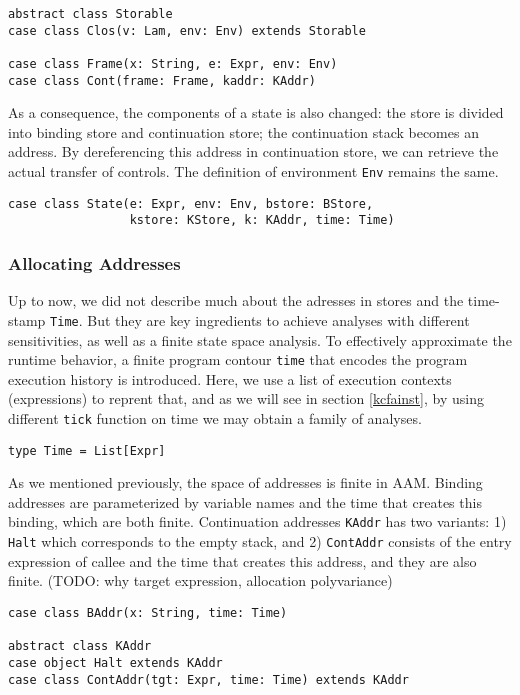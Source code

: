 \documentclass[acmsmall,review,anonymous]{acmart}\settopmatter{printfolios=true,printccs=false,printacmref=false}
\begin{document}
\begin{verbatim}
abstract class Storable 
case class Clos(v: Lam, env: Env) extends Storable

case class Frame(x: String, e: Expr, env: Env)
case class Cont(frame: Frame, kaddr: KAddr)
\end{verbatim}

As a consequence, the components of a state is also changed: 
the store is divided into binding store and continuation store;
the continuation stack becomes an address.
By dereferencing this address in continuation store, we can retrieve the 
actual transfer of controls. The definition of environment \texttt{Env}
remains the same.

\begin{verbatim}
case class State(e: Expr, env: Env, bstore: BStore, 
                 kstore: KStore, k: KAddr, time: Time)
\end{verbatim}

\subsubsection{Allocating Addresses}
Up to now, we did not describe much about the adresses in stores and the 
time-stamp \texttt{Time}.
But they are key ingredients to achieve analyses with different sensitivities,
as well as a finite state space analysis.
To effectively approximate the runtime behavior, a finite 
program contour \texttt{time} that encodes the program execution history is introduced.
Here, we use a list of execution contexts (expressions) to reprent that, and
as we will see in section \ref{kcfainst}, by using different \texttt{tick}
function on time we may obtain a family of analyses.

\begin{verbatim}
type Time = List[Expr]
\end{verbatim}

As we mentioned previously, the space of addresses is finite in AAM.
Binding addresses are parameterized by variable names and the time that creates this binding,
which are both finite.
Continuation addresses \texttt{KAddr} has two variants: 
1) \texttt{Halt} which corresponds to the empty stack, and
2) \texttt{ContAddr} consists of the entry expression of callee and the time that
creates this address, and they are also finite. 
(TODO: why target expression, allocation polyvariance)

\begin{verbatim}
case class BAddr(x: String, time: Time)

abstract class KAddr
case object Halt extends KAddr
case class ContAddr(tgt: Expr, time: Time) extends KAddr
\end{verbatim}
\end{document}
